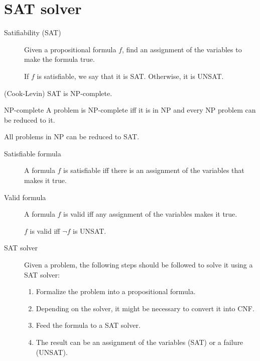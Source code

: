 \chapter{SAT solver}


\begin{description}
    \item[Satifiability (SAT)] 
        Given a propositional formula $f$, 
        find an assignment of the variables to make the formula true.

        If $f$ is satisfiable, we say that it is SAT. Otherwise, it is UNSAT.
\end{description}

\begin{theorem}(Cook-Levin) 
    SAT is NP-complete.

    \begin{descriptionlist}
        \item[NP-complete]
            A problem is NP-complete iff it is in NP and every NP problem can be reduced to it.
            \begin{remark}
                All problems in NP can be reduced to SAT.
            \end{remark}
    \end{descriptionlist}
\end{theorem}


\begin{description}
    \item[Satisfiable formula] 
        A formula $f$ is satisfiable iff there is an assignment of the variables that makes it true.


    \item[Valid formula] 
        A formula $f$ is valid iff any assignment of the variables makes it true.

        \begin{remark}
            $f$ is valid iff $\lnot f$ is UNSAT.
        \end{remark}


    \item[SAT solver] 
        Given a problem, the following steps should be followed to solve it using a SAT solver:
        \begin{enumerate}
            \item Formalize the problem into a propositional formula.
            \item Depending on the solver, it might be necessary to convert it into CNF.
            \item Feed the formula to a SAT solver.
            \item The result can be an assignment of the variables (SAT) or a failure (UNSAT).
        \end{enumerate}
\end{description}



